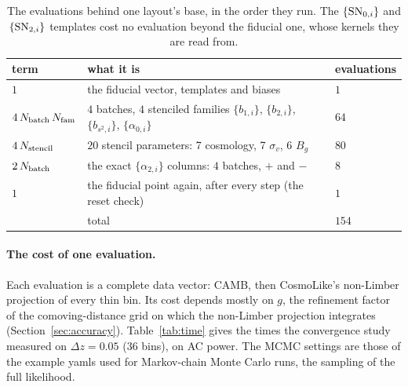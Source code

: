 \documentclass[11pt]{article}
\newcommand{\SNzi}{{\rm SN}_{0,i}}
\newcommand{\SNti}{{\rm SN}_{2,i}}
\begin{document}
\begin{table}[tbp]
  \centering
  \begin{tabular}{lll}
    \hline
    term & what it is & evaluations \\
    \hline
    $1$ & the fiducial vector, templates and biases & $1$ \\
    $4\,N_{\rm batch}\,N_{\rm fam}$ & $4$ batches, $4$ stenciled families
      $\{b_{1,i}\}$, $\{b_{2,i}\}$, $\{b_{s^2,i}\}$, $\{\alpha_{0,i}\}$ & $64$ \\
    $4\,N_{\rm stencil}$ & $20$ stencil parameters: 7 cosmology, 7 $\sigma_v$, 6 $B_g$
      & $80$ \\
    $2\,N_{\rm batch}$ & the exact $\{\alpha_{2,i}\}$ columns: $4$ batches,
      $+$ and $-$ & $8$ \\
    $1$ & the fiducial point again, after every step (the reset check) & $1$ \\
    \hline
    & total & $154$ \\
    \hline
  \end{tabular}
  \caption{The evaluations behind one layout's base, in the order they
    run.  The $\{\SNzi\}$ and $\{\SNti\}$ templates cost no evaluation
    beyond the fiducial one, whose kernels they are read from.}
  \label{tab:count}
\end{table}

\paragraph{The cost of one evaluation.}
Each evaluation is a complete data vector: CAMB, then CosmoLike's
non-Limber projection of every thin bin.  Its cost depends mostly on
$g$, the refinement factor of the comoving-distance grid on which the
non-Limber projection integrates (Section~\ref{sec:accuracy}).
Table~\ref{tab:time} gives the times the convergence study measured on
$\Delta z = 0.05$ ($36$ bins), on AC power.  The MCMC settings are those
of the example yamls used for Markov-chain Monte Carlo runs, the
sampling of the full likelihood.
\end{document}
